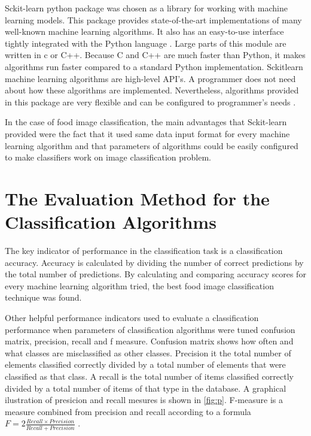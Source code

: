 Sckit-learn python package was chosen as a library for working with machine learning models. This package provides state-of-the-art implementations of many well-known machine learning algorithms. It also has an easy-to-use interface tightly integrated with the Python language \citep{pedregosa2011scikit}. Large parts of this module are written in c or C++. Because C and C++ are much faster than Python, it makes algorithms run faster compared to a standard Python implementation. Sckit\-learn machine learning algorithms are high-level API's.  A programmer does not need about how these algorithms are implemented. Nevertheless, algorithms provided in this package are very flexible and can be configured to programmer's needs \citep{buitinck2013api}.

In the case of food image classification, the main advantages that Sckit-learn provided were the fact that it used same data input format for every machine learning algorithm and that parameters of algorithms could be easily configured to make classifiers work on image classification problem.


\section{The Evaluation Method for the Classification Algorithms}

The key indicator of performance in the classification task is a classification accuracy. Accuracy is calculated by dividing the number of correct predictions by the total number of predictions. By calculating and comparing accuracy scores for every machine learning algorithm tried, the best food image classification technique was found.

Other helpful performance indicators used to evaluate a classification performance when parameters of classification algorithms were tuned confusion matrix, precision, recall and f measure. Confusion matrix shows how often and what classes are misclassified as other classes. Precision it the total number of elements classified correctly divided by a total number of elements that were classified as that class. A recall is the total number of items classified correctly divided by a total number of items of that type in the database. A graphical ilustration of presicion and recall mesures is shown in \autoref{fig:p}.  F-measure is a measure combined from precision and recall according to a formula \( F = 2 \frac{Recall \times Precision }{Recall  +  Precision} \)   \citep{ting2011}. 


